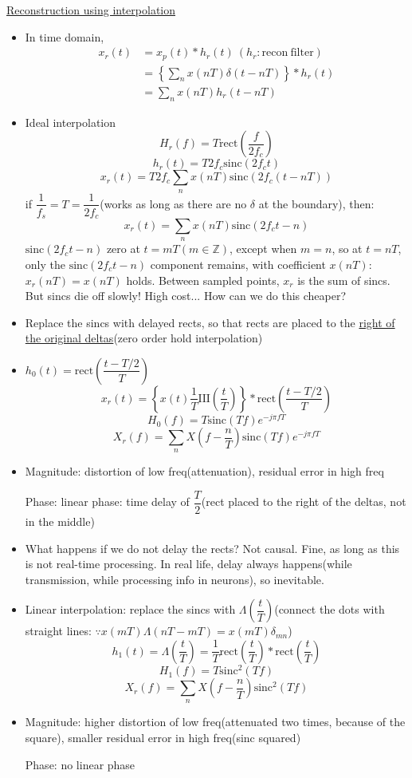 \documentclass{article}
\begin{document}
\underline{Reconstruction using interpolation}
\begin{itemize}
    \item In time domain,
    \begin{align*}
        x_r(t)&=x_p(t)*h_r(t)\:(h_r:\mathrm{recon\:filter})\\
              &=\left\{\sum_n x(nT)\delta(t-nT)\right\}*h_r(t)\\
              &=\sum_n x(nT)h_r(t-nT)
    \end{align*}
    
    \item Ideal interpolation
    \[H_r(f)=T\mathrm{rect}\left(\frac{f}{2f_c}\right)\]
    \[h_r(t)=T2f_c\mathrm{sinc}(2f_c t)\]
    \[x_r(t)=T2f_c\sum_n x(nT)\mathrm{sinc}(2f_c(t-nT))\]
    if $\dfrac{1}{f_s}=T=\dfrac{1}{2f_c}$(works as long as there are no $\delta$ at the boundary), then:
    \[x_r(t)=\sum_n x(nT)\mathrm{sinc}(2f_ct-n)\]
    $\mathrm{sinc}(2f_ct-n)$ zero at $t=mT(m\in\mathbb{Z})$, except when $m=n$, so at $t=nT$, only the $\mathrm{sinc}(2f_ct-n)$ component remains, with coefficient $x(nT)$: $x_r(nT)=x(nT)$ holds. Between sampled points, $x_r$ is the sum of sincs. But sincs die off slowly! High cost... How can we do this cheaper?
    
    \item Replace the sincs with delayed rects, so that rects are placed to the \underline{right of the original deltas}(zero order hold interpolation)
    \item $h_0(t)=\mathrm{rect}\left(\dfrac{t-T/2}{T}\right)$
    \[x_r(t)=\left\{x(t)\frac{1}{T}\mathrm{III}\left(\frac{t}{T}\right)\right\}*\mathrm{rect}\left(\frac{t-T/2}{T}\right)\]
    \[H_0(f)=T\mathrm{sinc}(Tf)e^{-j\pi fT}\]
    \[X_r(f)=\sum_n X\left(f-\dfrac{n}{T}\right)\mathrm{sinc}(Tf)e^{-j\pi fT}\]
    
    \item Magnitude: distortion of low freq(attenuation), residual error in high freq
    
    Phase: linear phase: time delay of $\dfrac{T}{2}$(rect placed to the right of the deltas, not in the middle)
    
    \item What happens if we do not delay the rects? Not causal. Fine, as long as this is not real-time processing. In real life, delay always happens(while transmission, while processing info in neurons), so inevitable.
    
    \item Linear interpolation: replace the sincs with $\Lambda\left(\dfrac{t}{T}\right)$(connect the dots with straight lines: $\because x(mT)\Lambda(nT-mT)=x(mT)\delta_{mn}$)
    \[h_1(t)=\Lambda\left(\frac{t}{T}\right)=\frac{1}{T}\mathrm{rect}\left(\frac{t}{T}\right)*\mathrm{rect}\left(\frac{t}{T}\right)\]
    \[H_1(f)=T\mathrm{sinc}^2(Tf)\]
    \[X_r(f)=\sum_n X\left(f-\frac{n}{T}\right)\mathrm{sinc}^2(Tf)\]
    
    \item Magnitude: higher distortion of low freq(attenuated two times, because of the square), smaller residual error in high freq(sinc squared)
    
    Phase: no linear phase
\end{itemize}
\end{document}
